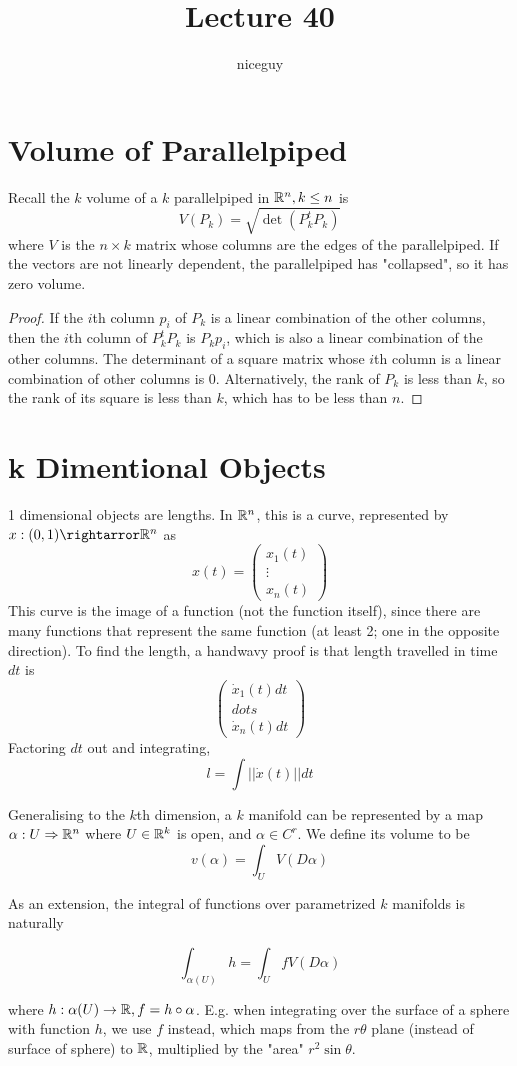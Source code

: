 \documentclass[12pt]{article}
\title{Lecture 40}
\author{niceguy}
\begin{document}
\maketitle

\section{Volume of Parallelpiped}

Recall the $k$ volume of a $k$ parallelpiped in $\mathbb{R}^n, k \leq n$ is
$$V(P_k) = \sqrt{\det(P_k^tP_k)}$$
where $V$ is the $n \times k$ matrix whose columns are the edges of the parallelpiped. If the vectors are not linearly dependent, the parallelpiped has "collapsed", so it has zero volume.

\begin{proof}
    If the $i$th column $p_i$ of $P_k$ is a linear combination of the other columns, then the $i$th column of $P_k^tP_k$ is $P_kp_i$, which is also a linear combination of the other columns. The determinant of a square matrix whose $i$th column is a linear combination of other columns is 0. Alternatively, the rank of $P_k$ is less than $k$, so the rank of its square is less than $k$, which has to be less than $n$.
\end{proof}

\section{k Dimentional Objects}

1 dimensional objects are lengths. In $\mathbb{R}^n$, this is a curve, represented by $x:(0,1) \rightarror \R^n$ as
$$x(t) = \begin{pmatrix} x_1(t) \\ \vdots \\ x_n(t) \end{pmatrix}$$
This curve is the image of a function (not the function itself), since there are many functions that represent the same function (at least 2; one in the opposite direction). To find the length, a handwavy proof is that length travelled in time $dt$ is
$$\begin{pmatrix} \dot x_1(t)dt \\ dots \\ \dot x_n(t)dt\end{pmatrix}$$
Factoring $dt$ out and integrating,
$$l = \int ||\dot x(t)||dt$$

Generalising to the $k$th dimension, a $k$ manifold can be represented by a map $\alpha: U \Rightarrow \mathbb{R}^n$ where $U \in \mathbb{R}^k$ is open, and $\alpha \in C^r$. We define its volume to be
$$v(\alpha) = \int_U V(D\alpha)$$

As an extension, the integral of functions over parametrized $k$ manifolds is naturally

$$\int_{\alpha(U)} h = \int_U fV(D\alpha)$$

where $h: \alpha(U) \rightarrow \mathbb{R}, f = h \circ \alpha$. E.g. when integrating over the surface of a sphere with function $h$, we use $f$ instead, which maps from the $r\theta$ plane (instead of surface of sphere) to $\mathbb{R}$, multiplied by the "area" $r^2\sin\theta$.
\end{document}
